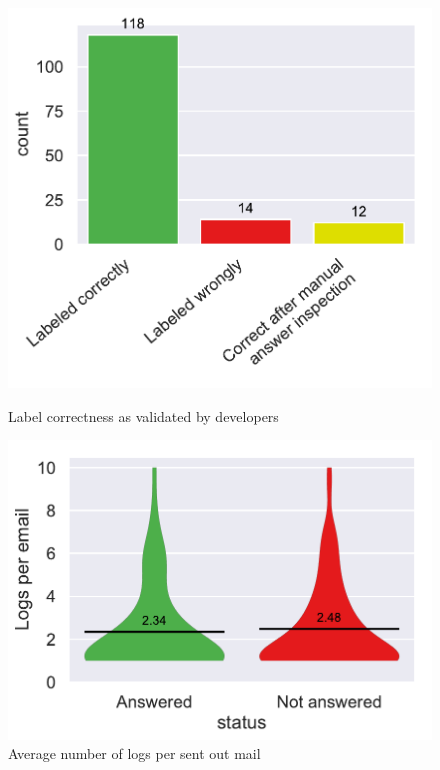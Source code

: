 \documentclass[\myrootdir/main.tex]{subfiles}
\begin{document}
\begin{figure}[htbp]
	\centering
	\begin{minipage}{0.45\textwidth}
		\centering
		\includegraphics[width=\textwidth, clip]{img/dev-mails/extraction-correct.pdf}
		\caption{Label correctness as validated by developers}
		\label{fig:mails-extraction-correct}
	\end{minipage}\hfill
	\begin{minipage}{0.45\textwidth}
		\centering
		\includegraphics[width=\textwidth, clip]{img/dev-mails/logs-per-mail.pdf}
		\caption{Average number of logs per sent out mail}
		\label{fig:mails-logs-per-mail}
	\end{minipage}
\end{figure}
\end{document}
